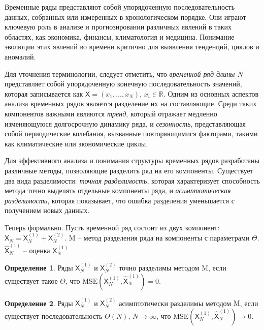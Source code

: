 \documentclass[12pt, specialist, subf
]{disser}
\date{}
\theoremstyle{definition}
\newcommand{\TS}{\mathsf{X}}
\newtheorem{definition}{Определение} %
\begin{document}
%


\tableofcontents
\noindent

\newpage


\intro


Временные ряды представляют собой упорядоченную последовательность данных, собранных или измеренных в хронологическом порядке. Они играют ключевую роль в анализе и прогнозировании различных явлений в таких областях, как экономика, финансы, климатология и медицина. Понимание эволюции этих явлений во времени критично для выявления тенденций, циклов и аномалий.

Для уточнения терминологии, следует отметить, что \textit{временной ряд длины \( N \)} представляет собой упорядоченную конечную последовательность значений, которая записывается как \( \TS = (x_1, \dots, x_{N}) \), $x_i \in \mathbb{R}$. Одним из основных аспектов анализа временных рядов является разделение их на составляющие. Среди таких компонентов важными являются \textit{тренд}, который отражает медленно изменяющуюся долгосрочную динамику ряда, и \textit{сезонность}, представляющая собой периодические колебания, вызванные повторяющимися факторами, такими как климатические или экономические циклы.

Для эффективного анализа и понимания структуры временных рядов разработаны различные методы, позволяющие разделить ряд на его компоненты. Существует два вида разделимости: \textit{точная разделимость}, которая характеризует способность метода точно выделять отдельные компоненты ряда, и \textit{асимптотическая разделимость}, которая показывает, что ошибка разделения уменьшается с получением новых данных.

Теперь формально. Пусть временной ряд состоит из двух компонент:
\( \TS_N = \TS^{(1)}_N + \TS^{(2)}_N \).
$\mathrm M$ -- метод разделения ряда на компоненты с параметрами $\Theta$.
$\hat{\TS}_N^{(1)}$ -- оценка $\TS_N^{(1)}$
\begin{definition}
	\label{def:exact}
	Ряды \( \TS^{(1)}_N \) и \( \TS^{(2)}_N \) точно разделимы методом $\mathrm M$, если существует такое \( {\Theta} \), что \( \mathrm{MSE}\left(\TS^{(1)}_N, \hat{\TS}^{(1)}_N\right) = 0 \).
\end{definition}

\begin{definition}
	\label{def:asymp}
	Ряды \( \TS^{(1)}_N \) и \( \TS^{(2)}_N \) асимптотически разделимы методом $\mathrm M$, если существует последовательность \( {\Theta}(N)\), \( N \rightarrow \infty \), что \( \mathrm{MSE}\left(\TS^{(1)}_N, \hat{\TS}^{(1)}_N\right) \rightarrow 0 \).
\end{definition}
\end{document}
